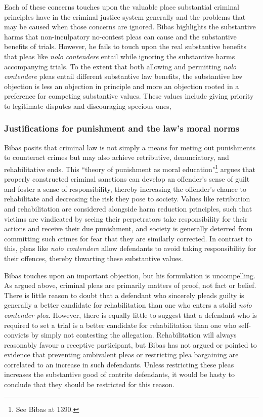 Each of these concerns touches upon the valuable place substantial criminal principles have in the criminal justice system generally and the problems that may be caused when those concerns are ignored. Bibas highlights the substantive harms that non-inculpatory no-contest pleas can cause and the substantive benefits of trials. However, he fails to touch upon the real substantive benefits that pleas like \textit{nolo contendere} entail while ignoring the substantive harms accompanying trials. To the extent that both allowing and permitting \textit{nolo contendere} pleas entail different substantive law benefits, the substantive law objection is less an objection in principle and more an objection rooted in a preference for competing substantive values. These values include giving priority to legitimate disputes and discouraging specious ones, 

\subsubsection{Justifications for punishment and the law's moral norms}

Bibas posits that criminal law is not simply a means for meting out punishments to counteract crimes but may also achieve retributive, denunciatory, and rehabilitative ends. This ``theory of punishment as moral education"\footnote{See Bibas at 1390.} argues that properly constructed criminal sanctions can develop an offender's sense of guilt and foster a sense of responsibility, thereby increasing the offender's chance to rehabilitate and decreasing the risk they pose to society. Values like retribution and rehabilitation are considered alongside harm reduction principles, such that victims are vindicated by seeing their perpetrators take responsibility for their actions and receive their due punishment, and society is generally deterred from committing such crimes for fear that they are similarly corrected. In contrast to this, pleas like \textit{nolo contendere} allow defendants to avoid taking responsibility for their offences, thereby thwarting these substantive values.

Bibas touches upon an important objection, but his formulation is uncompelling. As argued above, criminal pleas are primarily matters of proof, not fact or belief. There is little reason to doubt that a defendant who sincerely pleads guilty is generally a better candidate for rehabilitation than one who enters a stolid \textit{nolo contender plea}. However, there is equally little to suggest that a defendant who is required to set a trial is a better candidate for rehabilitation than one who self-convicts by simply not contesting the allegation. Rehabilitation will always reasonably favour a receptive participant, but Bibas has not argued or pointed to evidence that preventing ambivalent pleas or restricting plea bargaining are correlated to an increase in such defendants. Unless restricting these pleas increases the substantive good of contrite defendants, it would be hasty to conclude that they should be restricted for this reason.

